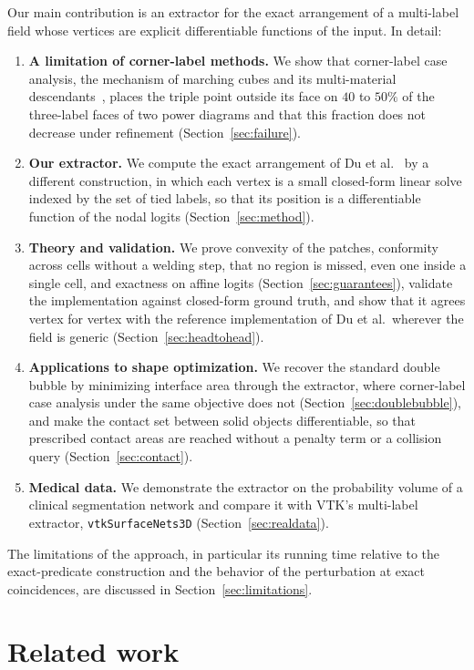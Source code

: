 \documentclass{egpubl}
\theoremstyle{definition}
\begin{document}
Our main contribution is an extractor for the exact arrangement of a
multi-label field whose vertices are explicit differentiable functions of the
input. In detail:
\begin{enumerate}
\item \textbf{A limitation of corner-label methods.} We show that corner-label case analysis, the mechanism of marching cubes
and its multi-material descendants~\cite{lorensen1987, hege1997}, places
the triple point outside its face on $40$ to $50\%$ of the three-label faces of two power diagrams
and that this fraction does not decrease under refinement
(Section~\ref{sec:failure}).
\item \textbf{Our extractor.} We compute the exact arrangement of Du et al.~\cite{du2022} by a different
construction, in which each vertex is a small closed-form linear solve indexed
by the set of tied labels, so that its position is a differentiable function of
the nodal logits (Section~\ref{sec:method}).
\item \textbf{Theory and validation.} We prove convexity of the patches, conformity across cells without a
welding step, that no region is missed, even one inside a single cell, and
exactness on affine logits (Section~\ref{sec:guarantees}),
validate the implementation against closed-form ground truth, and show that it
agrees vertex for vertex with the reference implementation of Du et al.\
wherever the field is generic (Section~\ref{sec:headtohead}).
\item \textbf{Applications to shape optimization.} We recover the standard double bubble by minimizing interface area through
the extractor, where corner-label case analysis under the same objective does
not (Section~\ref{sec:doublebubble}), and make the contact set between solid
objects differentiable, so that prescribed contact areas are reached without a
penalty term or a collision query (Section~\ref{sec:contact}).
\item \textbf{Medical data.} We demonstrate the extractor on the probability volume of a clinical
segmentation network and compare it with VTK's multi-label extractor,
\texttt{vtkSurfaceNets3D} (Section~\ref{sec:realdata}).
\end{enumerate}
The limitations of the approach, in particular its running time relative to
the exact-predicate construction and the behavior of the perturbation at
exact coincidences, are discussed in Section~\ref{sec:limitations}.

\section{Related work}
\label{sec:related}
\end{document}
